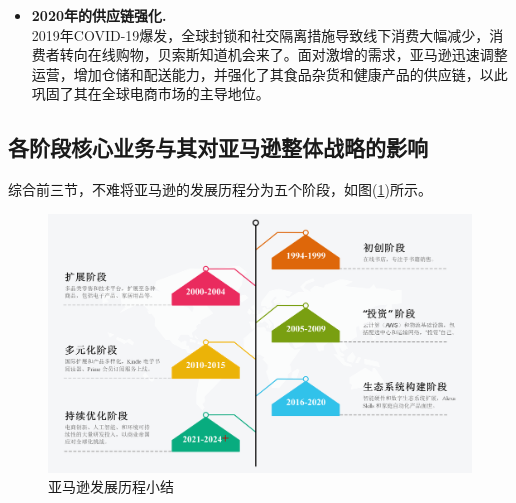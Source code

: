 \documentclass[12pt]{ctexart}
\begin{document}
\begin{itemize}
    \item \textbf{2020年的供应链强化.} \\
    2019年COVID-19爆发，全球封锁和社交隔离措施导致线下消费大幅减少，消费者转向在线购物，贝索斯知道机会来了。面对激增的需求，亚马逊迅速调整运营，增加仓储和配送能力，并强化了其食品杂货和健康产品的供应链，以此巩固了其在全球电商市场的主导地位。
    
\end{itemize}

\subsection{各阶段核心业务与其对亚马逊整体战略的影响}

综合前三节，不难将亚马逊的发展历程分为五个阶段，如图(\ref{sum})所示。

\begin{figure}[htbp!]
    \centering
    \includegraphics[width=1\textwidth]{Images/Timeline 17.png}
    \caption{亚马逊发展历程小结}
    \label{sum}
\end{figure}
\end{document}
